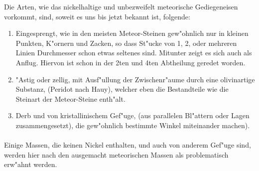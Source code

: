 \documentclass[a4paper, 11pt, oneside, polutonikogreek, german]{article}
\begin{document}
Die Arten, wie das nickelhaltige und unbezweifelt meteorische Gediegeneisen vorkommt, sind, soweit es uns bis jetzt bekannt ist, folgende:
\begin{enumerate}
    \item Eingesprengt, wie in den meisten Meteor-Steinen gew"ohnlich nur in kleinen Punkten, K"ornern und Zacken, so dass St"ucke von 1, 2, oder mehreren Linien Durchmesser schon etwas seltenes sind. Mitunter zeigt es sich auch als Anflug. Hiervon ist schon in der 2ten und 4ten Abtheilung geredet worden.
    \item "Astig oder zellig, mit Ausf"ullung der Zwischenr"aume durch eine olivinartige Substanz, (Peridot nach Hauy), welcher eben die Bestandteile wie die Steinart der Meteor-Steine enth"alt.
    \item Derb und von kristallinischem Gef"uge, (aus parallelen Bl"attern oder Lagen zusammengesetzt), die gew"ohnlich bestimmte Winkel miteinander machen).
\end{enumerate}
\paragraph{}
Einige Massen, die keinen Nickel enthalten, und auch von anderem Gef"uge sind, werden hier nach den ausgemacht meteorischen Massen als problematisch erw"ahnt werden.
\end{document}
